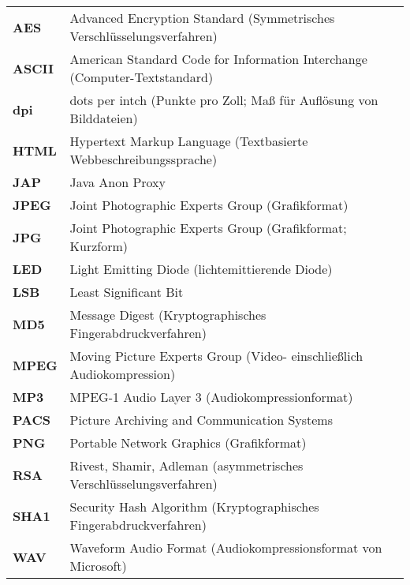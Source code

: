 \begin{center}
\begin{tabular}{ll}
\textbf{AES}	&	Advanced Encryption Standard (Symmetrisches Verschlüsselungsverfahren)\\
\textbf{ASCII}&	American Standard Code for Information Interchange (Computer-Textstandard)\\
\textbf{dpi}	&	dots per intch (Punkte pro Zoll; Maß für Auflösung von Bilddateien)\\
\textbf{HTML}	&	Hypertext Markup Language (Textbasierte Webbeschreibungssprache)\\
\textbf{JAP}	&	Java Anon Proxy\\
\textbf{JPEG}	&	Joint Photographic Experts Group (Grafikformat)\\
\textbf{JPG}	&	Joint Photographic Experts Group (Grafikformat; Kurzform)\\
\textbf{LED}	&	Light Emitting Diode (lichtemittierende Diode)\\
\textbf{LSB}	&	Least Significant Bit\\
\textbf{MD5}	& Message Digest (Kryptographisches Fingerabdruckverfahren)\\
\textbf{MPEG}	&	Moving Picture Experts Group (Video- einschließlich Audiokompression)\\
\textbf{MP3}	&	MPEG-1 Audio Layer 3 (Audiokompressionformat)\\
\textbf{PACS}	&	Picture Archiving and Communication Systems\\
\textbf{PNG}	&	Portable Network Graphics (Grafikformat)\\
\textbf{RSA}	&	Rivest, Shamir, Adleman (asymmetrisches Verschlüsselungsverfahren)\\
\textbf{SHA1}	&	Security Hash Algorithm (Kryptographisches Fingerabdruckverfahren)\\
\textbf{WAV}	&	Waveform Audio Format (Audiokompressionsformat von Microsoft)\\
\end{tabular}
\end{center}

